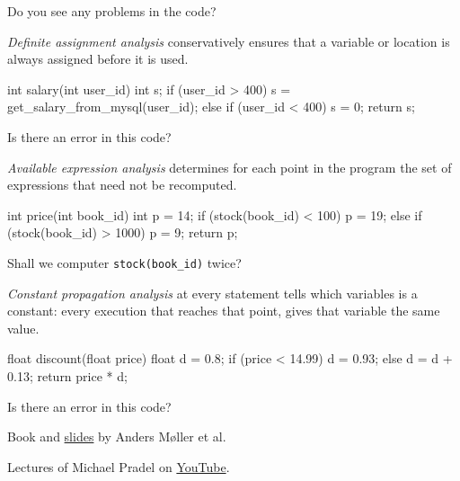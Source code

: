 \documentclass{article}
\begin{document}
Do you see any problems in the code?

\plush{}


\emph{Definite assignment analysis} conservatively ensures that a variable or location is always assigned before it is used.

{\small
\begin{ffcode}
int salary(int user_id) {
  int s;
  if (user_id > 400) {
    s = get_salary_from_mysql(user_id);
  } else if (user_id < 400) {
    s = 0;
  }
  return s;
}
\end{ffcode}
}

Is there an error in this code?

\plush{}


\emph{Available expression analysis} determines for each point in the program the set of expressions that need not be recomputed.

{\small
\begin{ffcode}
int price(int book_id) {
  int p = 14;
  if (stock(book_id) < 100) {
    p = 19;
  } else if (stock(book_id) > 1000) {
    p = 9;
  }
  return p;
}
\end{ffcode}
}

Shall we computer \texttt{stock(book\_id)} twice?

\plush{}


\emph{Constant propagation analysis} at every statement tells which variables is a constant:
every execution that reaches that point, gives that variable the same value.

{\small
\begin{ffcode}
float discount(float price) {
  float d = 0.8;
  if (price < 14.99)
    d = 0.93;
  else
    d = d + 0.13;
  return price * d;
}
\end{ffcode}
}

Is there an error in this code?

\plush{}


Book and \href{http://cs.au.dk/~amoeller/spa/}{slides} by Anders M\o{}ller et al.

Lectures of Michael Pradel on \href{https://www.youtube.com/watch?v=rJYgTJaXZU0}{YouTube}.
\end{document}
